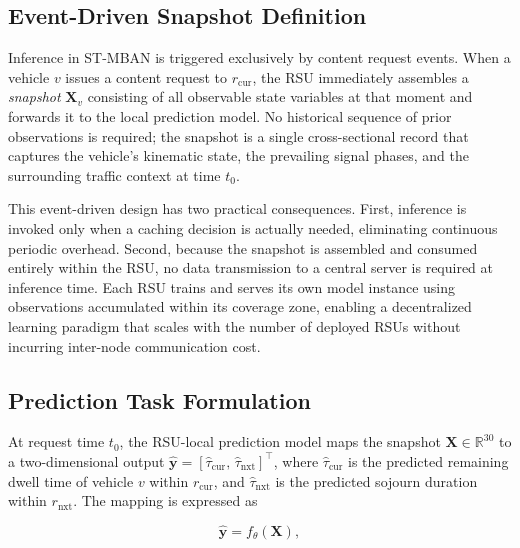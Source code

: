 \documentclass[journal]{IEEEtran}
\begin{document}
\subsection{Event-Driven Snapshot Definition}
\label{sec.net.B}

Inference in ST-MBAN is triggered exclusively by content request events.
When a vehicle $v$ issues a content request to $r_{\text{cur}}$, the RSU
immediately assembles a \emph{snapshot} $\mathbf{X}_v$ consisting of all observable
state variables at that moment and forwards it to the local prediction model.
No historical sequence of prior observations is required; the snapshot is a single
cross-sectional record that captures the vehicle's kinematic state, the prevailing
signal phases, and the surrounding traffic context at time $t_0$.

This event-driven design has two practical consequences.
First, inference is invoked only when a caching decision is actually needed,
eliminating continuous periodic overhead.
Second, because the snapshot is assembled and consumed entirely within the RSU,
no data transmission to a central server is required at inference time.
Each RSU trains and serves its own model instance using observations accumulated
within its coverage zone, enabling a decentralized learning paradigm that scales
with the number of deployed RSUs without incurring inter-node communication cost.

\subsection{Prediction Task Formulation}
\label{sec.net.C}

At request time $t_0$, the RSU-local prediction model maps the snapshot
$\mathbf{X} \in \mathbb{R}^{30}$ to a two-dimensional output
$\hat{\mathbf{y}} = [\hat{\tau}_{\text{cur}},\, \hat{\tau}_{\text{nxt}}]^\top$,
where $\hat{\tau}_{\text{cur}}$ is the predicted remaining dwell time of vehicle $v$
within $r_{\text{cur}}$, and $\hat{\tau}_{\text{nxt}}$ is the predicted sojourn
duration within $r_{\text{nxt}}$.
The mapping is expressed as

\begin{equation}
  \hat{\mathbf{y}} = f_\theta(\mathbf{X}),
  \label{eq:task}
\end{equation}
\end{document}
